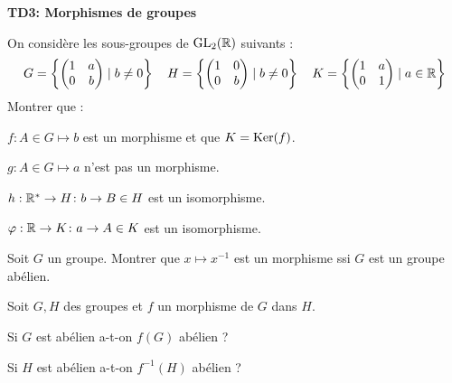 \documentclass{report}
\begin{document}
\begin{center}
    \huge{\textbf{TD3: Morphismes de groupes}}
\end{center}

\begin{exo}
    On considère les sous-groupes de \(\text{GL}_2(\mathbb{R})\) suivants :
    \[ G=\left\{ \begin{pmatrix}1&a\\0&b\end{pmatrix}
        \mid b\neq 0 \right\} \quad
       H=\left\{ \begin{pmatrix}1&0\\0&b\end{pmatrix}
       \mid b \neq 0 \right\} \quad
       K=\left\{ \begin{pmatrix}1&a\\0&1\end{pmatrix}
       \mid a \in \mathbb{R} \right\}
    \] Montrer que :
    \begin{q}{1}
        \(f : A\in G \mapsto b\) est un morphisme et que \(K=\operatorname{Ker}(f)\).
    \end{q}
    \begin{q}{2}
        \(g : A\in G \mapsto a\) n'est pas un morphisme.
    \end{q}
    \begin{q}{3}
        \(h: \mathbb{R}^*\to H\colon b \to B\in H\) est un isomorphisme.
    \end{q}
    \begin{q}{4}
        \(\varphi: \mathbb{R}\to K\colon a \to A\in K\) est un isomorphisme.
    \end{q}
\end{exo}

\begin{exo}
    Soit \(G\) un groupe. Montrer que \(x\mapsto x^{-1}\) est un morphisme
    ssi \(G\) est un groupe abélien.
\end{exo}

\begin{exo}
    Soit \(G, H\) des groupes et \(f\) un morphisme de \(G\) dans \(H\).
    \begin{q}{1}
        Si \(G\) est abélien a-t-on \(f(G)\) abélien ?
    \end{q}
    \begin{q}{2}
        Si \(H\) est abélien a-t-on \(f^{-1}(H)\) abélien ?
    \end{q}
\end{exo}
\end{document}
